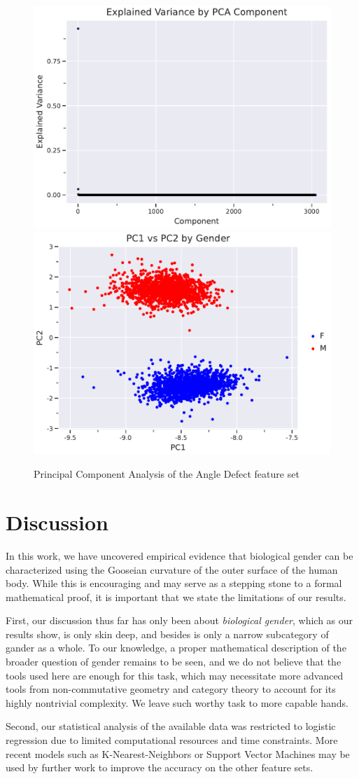 \documentclass[11pt]{article}
\begin{document}
\begin{figure}
    \centering
    \includegraphics[width=.45\textwidth]{../plots/pca_variance.pdf}
    \includegraphics[width=.45\textwidth]{../plots/pca_components.pdf}
    \caption{Principal Component Analysis of the Angle Defect feature set}
    \label{fig:pca}
\end{figure}

\section{Discussion}

In this work, we have uncovered empirical evidence that biological gender can be characterized using the Gooseian curvature of the outer surface of the human body. While this is encouraging and may serve as a stepping stone to a formal mathematical proof, it is important that we state the limitations of our results.

First, our discussion thus far has only been about \textit{biological gender}, which as our results show, is only skin deep, and besides is only a narrow subcategory of gander as a whole. To our knowledge, a proper mathematical description of the broader question of gender remains to be seen, and we do not believe that the tools used here are enough for this task, which may necessitate more advanced tools from non-commutative geometry and category theory to account for its highly nontrivial complexity. We leave such worthy task to more capable hands.

Second, our statistical analysis of the available data was restricted to logistic regression due to limited computational resources and time constraints. More recent models such as K-Nearest-Neighbors \cite{Knns} or Support Vector Machines \cite{SVMs} may be used by further work to improve the accuracy on the other feature sets.

 

\end{document}
